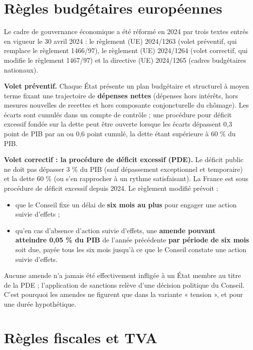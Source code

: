 \documentclass[
  11pt,
  11pt,
  a4paper,
  openany]{book}
\providecommand{\tightlist}{%
  \setlength{\itemsep}{0pt}\setlength{\parskip}{0pt}}
\begin{document}
\hypertarget{sec:regles-budgetaires-ue}{%
\section{Règles budgétaires
européennes}\label{sec:regles-budgetaires-ue}}

Le cadre de gouvernance économique a été réformé en 2024 par trois
textes entrés en vigueur le 30 avril 2024 : le règlement (UE) 2024/1263
(volet préventif, qui remplace le règlement 1466/97), le règlement (UE)
2024/1264 (volet correctif, qui modifie le règlement 1467/97) et la
directive (UE) 2024/1265 (cadres budgétaires nationaux).

\textbf{Volet préventif.} Chaque État présente un plan budgétaire et
structurel à moyen terme fixant une trajectoire de \textbf{dépenses
nettes} (dépenses hors intérêts, hors mesures nouvelles de recettes et
hors composante conjoncturelle du chômage). Les écarts sont cumulés dans
un compte de contrôle ; une procédure pour déficit excessif fondée sur
la dette peut être ouverte lorsque les écarts dépassent 0,3 point de PIB
par an ou 0,6 point cumulé, la dette étant supérieure à 60 \% du PIB.

\textbf{Volet correctif : la procédure de déficit excessif (PDE).} Le
déficit public ne doit pas dépasser 3 \% du PIB (sauf dépassement
exceptionnel et temporaire) et la dette 60 \% (ou s'en rapprocher à un
rythme satisfaisant). La France est sous procédure de déficit excessif
depuis 2024. Le règlement modifié prévoit :

\begin{itemize}
\tightlist
\item
  que le Conseil fixe un délai de \textbf{six mois au plus} pour engager
  une action suivie d'effets ;
\item
  qu'en cas d'absence d'action suivie d'effets, une \textbf{amende
  pouvant atteindre 0,05 \% du PIB} de l'année précédente \textbf{par
  période de six mois} soit due, payée tous les six mois jusqu'à ce que
  le Conseil constate une action suivie d'effets.
\end{itemize}

Aucune amende n'a jamais été effectivement infligée à un État membre au
titre de la PDE ; l'application de sanctions relève d'une décision
politique du Conseil. C'est pourquoi les amendes ne figurent que dans la
variante « tension », et pour une durée hypothétique.

\hypertarget{sec:tva}{%
\section{Règles fiscales et TVA}\label{sec:tva}}
\end{document}
